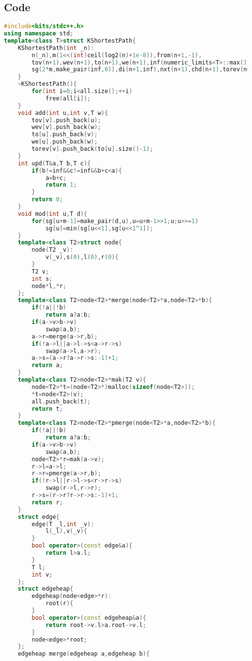 \documentclass{book}
\begin{document}
\subsection*{Code}
\begin{lstlisting}[language=C++,title={K Shortest Path.hpp (5105 bytes, 170 lines)}]
#include<bits/stdc++.h>
using namespace std;
template<class T>struct KShortestPath{
    KShortestPath(int _n):
        n(_n),m(1<<(int)ceil(log2(n)+1e-8)),from(n+1,-1),
        tov(n+1),wev(n+1),to(n+1),we(n+1),inf(numeric_limits<T>::max()),
        sg(2*m,make_pair(inf,0)),di(n+1,inf),nxt(n+1),chd(n+1),torev(n+1){
    }
    ~KShortestPath(){
        for(int i=0;i<all.size();++i)
            free(all[i]);
    }
    void add(int u,int v,T w){
        tov[v].push_back(u);
        wev[v].push_back(w);
        to[u].push_back(v);
        we[u].push_back(w);
        torev[v].push_back(to[u].size()-1);
    }
    int upd(T&a,T b,T c){
        if(b!=inf&&c!=inf&&b+c<a){
            a=b+c;
            return 1;
        }
        return 0;
    }
    void mod(int u,T d){
        for(sg[u+m-1]=make_pair(d,u),u=u+m-1>>1;u;u>>=1)
            sg[u]=min(sg[u<<1],sg[u<<1^1]);
    }
    template<class T2>struct node{
        node(T2 _v):
            v(_v),s(0),l(0),r(0){
        }
        T2 v;
        int s;
        node*l,*r;
    };
    template<class T2>node<T2>*merge(node<T2>*a,node<T2>*b){
        if(!a||!b)
            return a?a:b;
        if(a->v>b->v)
            swap(a,b);
        a->r=merge(a->r,b);
        if(!a->l||a->l->s<a->r->s)
            swap(a->l,a->r);
        a->s=(a->r?a->r->s:-1)+1;
        return a;
    }
    template<class T2>node<T2>*mak(T2 v){
        node<T2>*t=(node<T2>*)malloc(sizeof(node<T2>));
        *t=node<T2>(v);
        all.push_back(t);
        return t;
    }
    template<class T2>node<T2>*pmerge(node<T2>*a,node<T2>*b){
        if(!a||!b)
            return a?a:b;
        if(a->v>b->v)
            swap(a,b);
        node<T2>*r=mak(a->v);
        r->l=a->l;
        r->r=pmerge(a->r,b);
        if(!r->l||r->l->s<r->r->s)
            swap(r->l,r->r);
        r->s=(r->r?r->r->s:-1)+1;
        return r;
    }
    struct edge{
        edge(T _l,int _v):
            l(_l),v(_v){
        }
        bool operator>(const edge&a){
            return l>a.l;
        }
        T l;
        int v;
    };
    struct edgeheap{
        edgeheap(node<edge>*r):
            root(r){
        }
        bool operator>(const edgeheap&a){
            return root->v.l>a.root->v.l;
        }
        node<edge>*root;
    };
    edgeheap merge(edgeheap a,edgeheap b){

\end{lstlisting}
\end{document}
